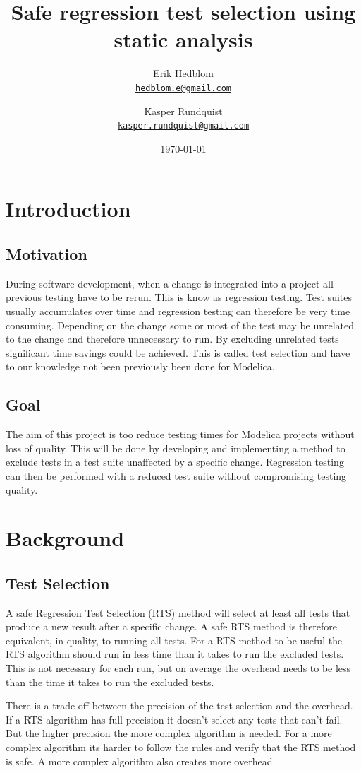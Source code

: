 \documentclass{cslthse-msc}
\author{
	Erik Hedblom \\
	{\normalsize \href{mailto:hedblom.e@gmail.com}{\texttt{hedblom.e@gmail.com}}}
	\and
	Kasper Rundquist \\
	{\normalsize \href{mailto:kasper.rundquist@gmail.com}{\texttt{kasper.rundquist@gmail.com}}}
}
\title{Safe regression test selection using static analysis}
\date{\today}
\begin{document}
\makefrontmatter
\chapter[Introduction]{Introduction}

\section{Motivation}
During software development, when a change is integrated into a project all previous testing have to be rerun. This is know as regression testing. Test suites usually accumulates over time and regression testing can therefore be very time consuming. Depending on the change some or most of the test may be unrelated to the change and therefore unnecessary to run. By excluding unrelated tests significant time savings could be achieved. This is called test selection and have to our knowledge not been previously been done for Modelica. 


\section{Goal}
The aim of this project is too reduce testing times for Modelica projects without loss of quality. This will be done by developing and implementing a method to exclude tests in a test suite unaffected by a specific change. Regression testing can then be performed with a reduced test suite without compromising testing quality.


\chapter[Background]{Background}
\section{Test Selection}
A safe Regression Test Selection (RTS) method will select at least all tests that produce a new result after a specific change. A safe RTS method is therefore equivalent, in quality, to running all tests. For a RTS method to be useful the RTS algorithm should run in less time than it takes to run the excluded tests. This is not necessary for each run, but on average the overhead needs to be less than the time it takes to run the excluded tests.

There is a trade-off between the precision of the test selection and the overhead. If a RTS algorithm has full precision it doesn't select any tests that can't fail. But the higher precision the more complex algorithm is needed. For a more complex algorithm its harder to follow the rules and verify that the RTS method is safe. A more complex algorithm also creates more overhead.
\end{document}
